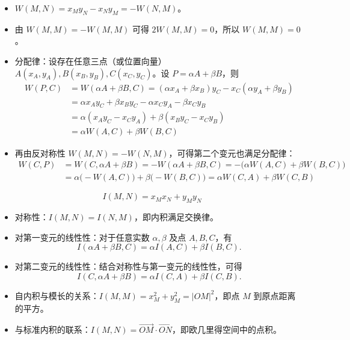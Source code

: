 \begin{itemize}
\item $W(M,N) = x_M y_N - x_N y_M = -W(N,M)$。
\item 由 $W(M,M) = -W(M,M)$ 可得 $2W(M,M) = 0$，所以 $W(M,M) = 0$。
\item 分配律：设存在任意三点（或位置向量） $A(x_A, y_A), B(x_B, y_B), C(x_C, y_C)$。设 $P = \alpha A + \beta B$，则
\begin{align*}W(P, C) &= W(\alpha A + \beta B, C)= (\alpha x_A + \beta x_B)y_C - x_C(\alpha y_A + \beta y_B) \\&= \alpha x_A y_C + \beta x_B y_C - \alpha x_C y_A - \beta x_C y_B \\&= \alpha (x_A y_C - x_C y_A) + \beta (x_B y_C - x_C y_B) \\&= \alpha W(A, C) + \beta W(B, C)\end{align*}
\item 再由反对称性 $W(M,N) = -W(N,M)$，可得第二个变元也满足分配律：
\begin{align*}W(C, P) &= W(C, \alpha A + \beta B) = -W(\alpha A + \beta B, C)= -\big(\alpha W(A, C) + \beta W(B, C)\big) \\&= \alpha \big(-W(A, C)\big) + \beta \big(-W(B, C)\big) = \alpha W(C, A) + \beta W(C, B)\end{align*}
\end{itemize}

\begin{definition}[内积 $I$]
$$ I(M, N) = x_M x_N + y_M y_N $$
\end{definition}
\begin{itemize}
    \item 对称性：$I(M,N) = I(N,M)$，即内积满足交换律。
    \item 对第一变元的线性性：对于任意实数 $\alpha,\beta$ 及点 $A,B,C$，有
    $$ I(\alpha A + \beta B, C) = \alpha I(A,C) + \beta I(B,C). $$
    \item 对第二变元的线性性：结合对称性与第一变元的线性性，可得
    $$ I(C, \alpha A + \beta B) = \alpha I(C,A) + \beta I(C,B). $$
    \item 自内积与模长的关系：$I(M,M) = x_M^2 + y_M^2 = |OM|^2$，即点 $M$ 到原点距离的平方。
    \item 与标准内积的联系：$I(M,N) = \overrightarrow{OM} \cdot \overrightarrow{ON}$，即欧几里得空间中的点积。
\end{itemize}

